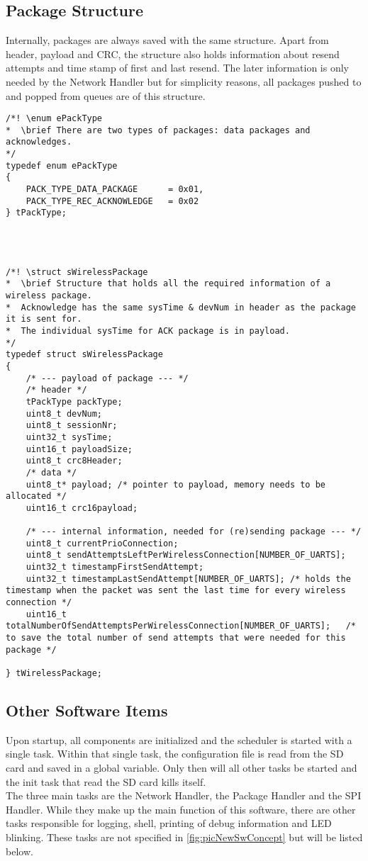 \subsection{Package Structure} \label{subsec:txtPackageStructure}
Internally, packages are always saved with the same structure. Apart from header, payload and CRC, the structure also holds information about resend attempts and time stamp of first and last resend. The later information is only needed by the Network Handler but for simplicity reasons, all packages pushed to and popped from queues are of this structure.
\begin{lstlisting}
/*! \enum ePackType
*  \brief There are two types of packages: data packages and acknowledges.
*/
typedef enum ePackType
{
    PACK_TYPE_DATA_PACKAGE 		= 0x01,
    PACK_TYPE_REC_ACKNOWLEDGE 	= 0x02
} tPackType;




/*! \struct sWirelessPackage
*  \brief Structure that holds all the required information of a wireless package.
*  Acknowledge has the same sysTime & devNum in header as the package it is sent for.
*  The individual sysTime for ACK package is in payload.
*/
typedef struct sWirelessPackage
{
    /* --- payload of package --- */
    /* header */
    tPackType packType;
    uint8_t devNum;
    uint8_t sessionNr;
    uint32_t sysTime;
    uint16_t payloadSize;
    uint8_t crc8Header;
    /* data */
    uint8_t* payload; /* pointer to payload, memory needs to be allocated */
    uint16_t crc16payload;
    
    /* --- internal information, needed for (re)sending package --- */
    uint8_t currentPrioConnection;
    uint8_t sendAttemptsLeftPerWirelessConnection[NUMBER_OF_UARTS];
    uint32_t timestampFirstSendAttempt;
    uint32_t timestampLastSendAttempt[NUMBER_OF_UARTS];	/* holds the timestamp when the packet was sent the last time for every wireless connection */
    uint16_t totalNumberOfSendAttemptsPerWirelessConnection[NUMBER_OF_UARTS];	/* to save the total number of send attempts that were needed for this package */
    
} tWirelessPackage;
\end{lstlisting}
%
%
%
\subsection{Other Software Items}
Upon startup, all components are initialized and the scheduler is started with a single task. Within that single task, the configuration file is read from the SD card and saved in a global variable. Only then will all other tasks be started and the init task that read the SD card kills itself.\\
The three main tasks are the Network Handler, the Package Handler and the SPI Handler. While they make up the main function of this software, there are other tasks responsible for logging, shell, printing of debug information and LED blinking. These tasks are not specified in \autoref{fig:picNewSwConcept} but will be listed below.\\
%
